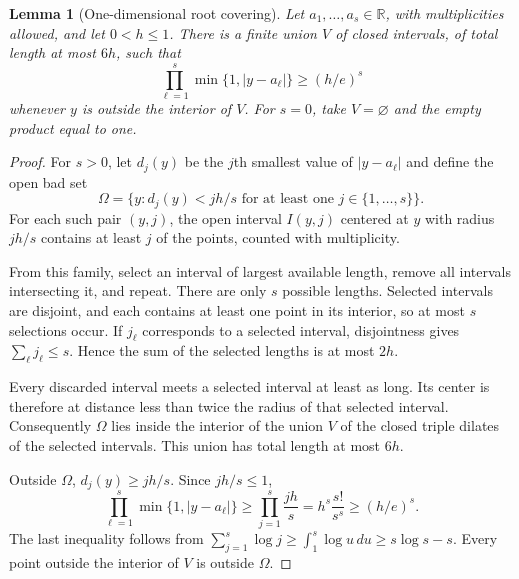 \documentclass[11pt]{article}
\numberwithin{equation}{section}
\newtheorem{lemma}[theorem]{Lemma}
\theoremstyle{definition}
\newcommand{\R}{\mathbb R}
\begin{document}
\begin{lemma}[One-dimensional root covering]\label{lem:cover}
Let $a_1,\ldots,a_s\in\R$, with multiplicities allowed, and let $0<h\le1$. There is a finite union $V$ of closed intervals, of total length at most $6h$, such that
\begin{equation}\label{eq:rootproduct}
\prod_{\ell=1}^s\min\{1,|y-a_\ell|\}\ge(h/e)^s
\end{equation}
whenever $y$ is outside the interior of $V$.
For $s=0$, take $V=\varnothing$ and the empty product equal to one.
\end{lemma}
\begin{proof}
For $s>0$, let $d_j(y)$ be the $j$th smallest value of $|y-a_\ell|$ and define the open bad set
\[
\Omega=\{y:d_j(y)<jh/s\text{ for at least one }j\in\{1,\ldots,s\}\}.
\]
For each such pair $(y,j)$, the open interval $I(y,j)$ centered at $y$ with radius $jh/s$ contains at least $j$ of the points, counted with multiplicity.

From this family, select an interval of largest available length, remove all intervals intersecting it, and repeat. There are only $s$ possible lengths. Selected intervals are disjoint, and each contains at least one point in its interior, so at most $s$ selections occur. If $j_\ell$ corresponds to a selected interval, disjointness gives $\sum_\ell j_\ell\le s$. Hence the sum of the selected lengths is at most $2h$.

Every discarded interval meets a selected interval at least as long. Its center is therefore at distance less than twice the radius of that selected interval. Consequently $\Omega$ lies inside the interior of the union $V$ of the closed triple dilates of the selected intervals. This union has total length at most $6h$.

Outside $\Omega$, $d_j(y)\ge jh/s$. Since $jh/s\le1$,
\[
\prod_{\ell=1}^s\min\{1,|y-a_\ell|\}
\ge\prod_{j=1}^s\frac{jh}{s}
=h^s\frac{s!}{s^s}\ge(h/e)^s.
\]
The last inequality follows from
$\sum_{j=1}^s\log j\ge\int_1^s\log u\,du\ge s\log s-s$.
Every point outside the interior of $V$ is outside $\Omega$.
\end{proof}
\end{document}
